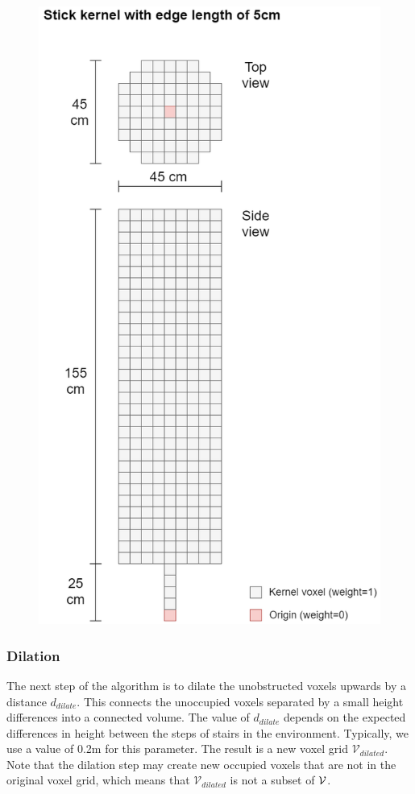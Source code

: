 \begin{figure}
    \label{fig:stick_kernel}
    \includegraphics*[width=\textwidth]{./fig/structuring_element.png}
\end{figure}

\subsubsection{Dilation}
The next step of the algorithm is to dilate the unobstructed voxels upwards by a distance \(d_{dilate}\). This connects the unoccupied voxels separated by a small height differences into a connected volume. The value of \(d_{dilate}\) depends on the expected differences in height between the steps of stairs in the environment. Typically, we use a value of 0.2m for this parameter. The result is a new voxel grid \(\mathcal{V}_{dilated}\). Note that the dilation step may create new occupied voxels that are not in the original voxel grid, which means that \(\mathcal{V}_{dilated}\) is not a subset of \(\mathcal{V}\).

